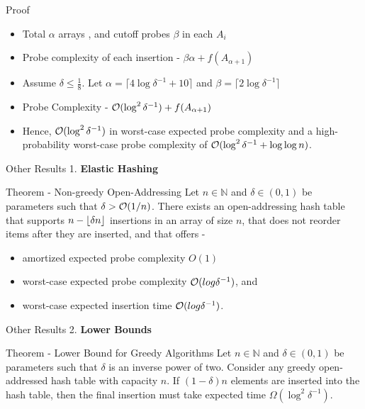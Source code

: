 \documentclass{beamer}
\begin{document}
\begin{frame}{Proof}
	\begin{itemize}
		\item Total $\alpha$ arrays , and cutoff probes $\beta$ in each $A_i$ 
		\item Probe complexity of each insertion - $\beta\alpha + f(A_{\alpha + 1})$ 
		\item Assume $\delta \le \frac{1}{8}$. Let $\alpha = \lceil 4\log{\delta^{-1} + 10} \rceil$ and $\beta = \lceil 2\log{\delta^{-1}}\rceil$
		\item Probe Complexity - ${\cal O}(\log^2{\delta^{-1}}) + f(A_{\alpha+1})$ 
		\item  Hence, ${\cal O}(\log^2{\delta^{-1}})$ in worst-case expected probe  complexity and a high-probability worst-case probe complexity of ${\cal O}(\log^2{\delta^{-1}} + \log{\log{n}})$.
	\end{itemize}
\end{frame}


\begin{frame} {Other Results}
	1. {\bf Elastic Hashing}
	\begin{block}{Theorem - Non-greedy Open-Addressing}
		Let $n \in \mathbb{N}$ and $\delta \in(0, 1)$ be parameters such that $\delta > 
		{\cal O}(1/n)$. There exists an open-addressing hash table that supports $n - \left\lfloor \delta n \right\rfloor$ insertions in an array of size $n$, that does not reorder items after they are inserted, and that oﬀers -
		\begin{itemize}
			\item amortized expected probe complexity $O(1)$
			\item worst-case expected probe complexity ${\cal O}(log \delta^{-1})$, and
			\item worst-case expected
			insertion time ${\cal O}(log \delta^{-1})$.
		\end{itemize}
	\end{block}
\end{frame}


\begin{frame}{Other Results}
	2. {\bf Lower Bounds}
	\begin{block}{Theorem - Lower Bound for Greedy Algorithms}
			Let $n \in \mathbb{N}$ and $\delta \in(0, 1)$ be parameters such that $\delta$ is an inverse power of two. Consider any greedy open-addressed hash table with capacity $n$. If $(1-\delta)n$ elements are inserted into the hash table, then the final insertion must take expected time $\Omega(\log^2{\delta^{-1}})$.
	\end{block}
\end{frame}
\end{document}
